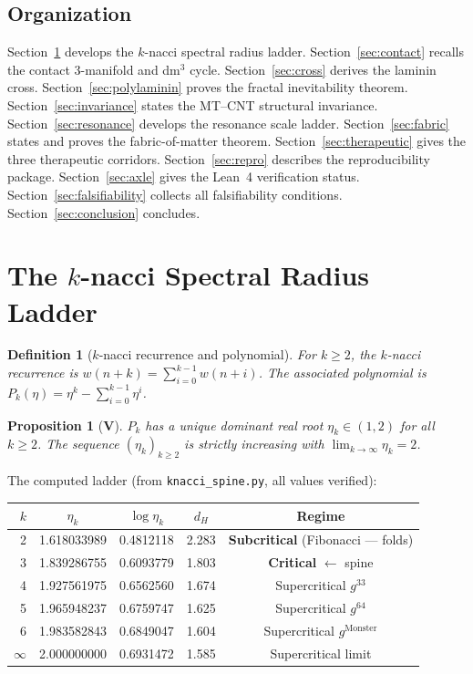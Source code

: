 \documentclass[12pt,a4paper]{article}
\newtheorem{proposition}[theorem]{Proposition}
\newtheorem{definition}[theorem]{Definition}
\newcommand{\etak}{\eta_k}
\newcommand{\kn}{$k$-nacci}
\begin{document}
\subsection{Organization}

Section~\ref{sec:knacci} develops the $k$-nacci spectral radius ladder.
Section~\ref{sec:contact} recalls the contact 3-manifold and dm$^3$ cycle.
Section~\ref{sec:cross} derives the laminin cross.
Section~\ref{sec:polylaminin} proves the fractal inevitability theorem.
Section~\ref{sec:invariance} states the MT--CNT structural invariance.
Section~\ref{sec:resonance} develops the resonance scale ladder.
Section~\ref{sec:fabric} states and proves the fabric-of-matter theorem.
Section~\ref{sec:therapeutic} gives the three therapeutic corridors.
Section~\ref{sec:repro} describes the reproducibility package.
Section~\ref{sec:axle} gives the Lean~4 verification status.
Section~\ref{sec:falsifiability} collects all falsifiability conditions.
Section~\ref{sec:conclusion} concludes.


\section{The $k$-nacci Spectral Radius Ladder}
\label{sec:knacci}

\begin{definition}[$k$-nacci recurrence and polynomial]
For $k\geq 2$, the \kn{} recurrence is
$w(n+k)=\sum_{i=0}^{k-1}w(n+i)$.
The associated polynomial is
$P_k(\eta)=\eta^k-\sum_{i=0}^{k-1}\eta^i$.
\end{definition}

\begin{proposition}[\textbf{V}]
$P_k$ has a unique dominant real root $\etak\in(1,2)$ for all $k\geq 2$.
The sequence $(\etak)_{k\geq 2}$ is strictly increasing with
$\lim_{k\to\infty}\etak=2$.
\end{proposition}

The computed ladder (from \texttt{knacci\_spine.py}, all values verified):

\begin{center}
\begin{tabular}{rcccc}
\toprule
$k$ & $\etak$ & $\log\etak$ & $d_H$ & Regime \\
\midrule
2 & 1.618033989 & 0.4812118 & 2.283 &
  \textbf{Subcritical} (Fibonacci --- folds)\\
3 & 1.839286755 & 0.6093779 & 1.803 &
  \textbf{Critical} $\leftarrow$ spine\\
4 & 1.927561975 & 0.6562560 & 1.674 & Supercritical $g^{33}$\\
5 & 1.965948237 & 0.6759747 & 1.625 & Supercritical $g^{64}$\\
6 & 1.983582843 & 0.6849047 & 1.604 & Supercritical $g^{\mathrm{Monster}}$\\
$\infty$ & 2.000000000 & 0.6931472 & 1.585 & Supercritical limit\\
\bottomrule
\end{tabular}
\end{center}
\end{document}
